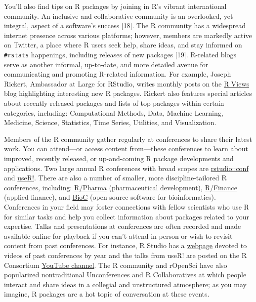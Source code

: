 \documentclass[10pt,letterpaper]{article}
\begin{document}
You'll also find tips on R packages by joining in R's vibrant
international community. An inclusive and collaborative community is an
overlooked, yet integral, aspect of a software's success {[}18{]}. The R
community has a widespread internet presence across various platforms;
however, members are markedly active on Twitter, a place where R users
seek help, share ideas, and stay informed on \texttt{\#rstats}
happenings, including releases of new packages {[}19{]}. R-related blogs
serve as another informal, up-to-date, and more detailed avenue for
communicating and promoting R-related information. For example, Joseph
Rickert, Ambassador at Large for RStudio, writes monthly posts on the
\href{https://rviews.rstudio.com/}{R Views} blog highlighting
interesting new R packages. Rickert also features special articles about
recently released packages and lists of top packages within certain
categories, including: Computational Methods, Data, Machine Learning,
Medicine, Science, Statistics, Time Series, Utilities, and
Visualization.

Members of the R community gather regularly at conferences to share
their latest work. You can attend---or access content from---these
conferences to learn about improved, recently released, or up-and-coming
R package developments and applications. Two large annual R conferences
with broad scopes are
\href{https://rstudio.com/conference/}{rstudio::conf} and
\href{https://www.r-consortium.org/}{useR!}. There are also a number of
smaller, more discipline-tailored R conferences, including:
\href{https://rinpharma.com/}{R/Pharma} (pharmaceutical development),
\href{https://www.rinfinance.com/}{R/Finance} (applied finance), and
\href{https://www.bioconductor.org/help/events/}{BioC} (open source
software for bioinformatics). Conferences in your field may foster
connections with fellow scientists who use R for similar tasks and help
you collect information about packages related to your expertise. Talks
and presentations at conferences are often recorded and made available
online for playback if you can't attend in person or wish to revisit
content from past conferences. For instance, R Studio has a
\href{https://rstudio.com/resources/rstudioconf-2020/}{webpage} devoted
to videos of past conferences by year and the talks from useR! are
posted on the R Consortium
\href{https://www.youtube.com/channel/UC_R5smHVXRYGhZYDJsnXTwg/featured}{YouTube
channel}. The R community and rOpenSci have also popularized
nontraditional Unconferences and R Collaboratives at which people
interact and share ideas in a collegial and unstructured atmosphere; as
you may imagine, R packages are a hot topic of conversation at these
events.
\end{document}
